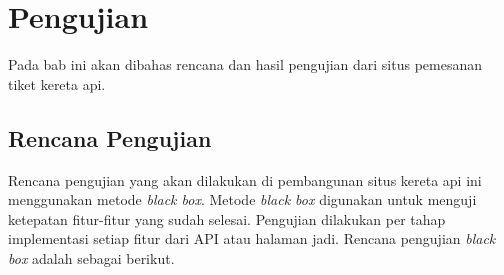 \chapter{Pengujian}
\label{chap:pengujian}
Pada bab ini akan dibahas rencana dan hasil pengujian dari situs pemesanan tiket kereta api.

\section{Rencana Pengujian}
\label{sec:rencanapengujian} 

Rencana pengujian yang akan dilakukan di pembangunan situs kereta api ini menggunakan metode \textit{black
box}. Metode \textit{black box} digunakan untuk menguji ketepatan fitur-fitur yang sudah selesai. Pengujian dilakukan per tahap implementasi setiap fitur dari API atau halaman jadi. Rencana pengujian \textit{black box} adalah sebagai berikut.
 
